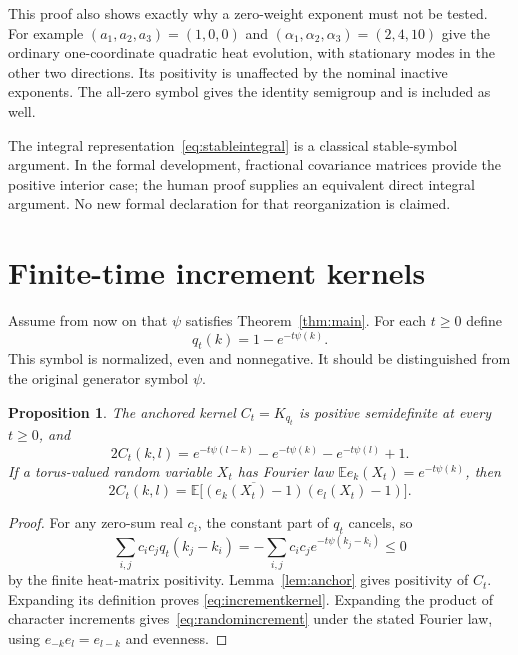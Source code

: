 \documentclass[11pt]{article}
\newtheorem{proposition}[theorem]{Proposition}
\theoremstyle{remark}\newtheorem{remark}[theorem]{Remark}
\begin{document}
This proof also shows exactly why a zero-weight exponent must
not be tested. For example $(a_1,a_2,a_3)=(1,0,0)$ and
$(\alpha_1,\alpha_2,\alpha_3)=(2,4,10)$ give the ordinary
one-coordinate quadratic heat evolution, with stationary modes
in the other two directions. Its positivity is unaffected by
the nominal inactive exponents. The all-zero symbol gives the
identity semigroup and is included as well.

The integral representation~\eqref{eq:stableintegral} is a
classical stable-symbol argument. In the formal development,
fractional covariance matrices provide the positive interior
case; the human proof supplies an equivalent direct integral
argument. No new formal declaration for that reorganization
is claimed.

\section{Finite-time increment kernels}
Assume from now on that $\psi$ satisfies Theorem~\ref{thm:main}.
For each $t\geq0$ define
\begin{equation}\label{eq:q}
 q_t(k)=1-e^{-t\psi(k)}.
\end{equation}
This symbol is normalized, even and nonnegative. It should be
distinguished from the original generator symbol $\psi$.

\begin{proposition}\label{prop:qt}
The anchored kernel $C_t=K_{q_t}$ is positive semidefinite at
every $t\geq0$, and
\begin{equation}\label{eq:incrementkernel}
 2C_t(k,l)=e^{-t\psi(l-k)}-e^{-t\psi(k)}-e^{-t\psi(l)}+1.
\end{equation}
If a torus-valued random variable $X_t$ has Fourier law
$\mathbb E e_k(X_t)=e^{-t\psi(k)}$, then
\begin{equation}\label{eq:randomincrement}
 2C_t(k,l)=\mathbb E\bigl[
       \overline{(e_k(X_t)-1)}(e_l(X_t)-1)\bigr].
\end{equation}
\end{proposition}
\begin{proof}
For any zero-sum real $c_i$, the constant part of $q_t$ cancels,
so
\[
 \sum_{i,j}c_i c_jq_t(k_j-k_i)
              =-\sum_{i,j}c_i c_je^{-t\psi(k_j-k_i)}\leq0
\]
by the finite heat-matrix positivity. Lemma~\ref{lem:anchor}
gives positivity of $C_t$. Expanding its definition proves
\eqref{eq:incrementkernel}. Expanding the product of character
increments gives~\eqref{eq:randomincrement} under the stated
Fourier law, using $e_{-k}e_l=e_{l-k}$ and evenness.
\end{proof}
\end{document}
